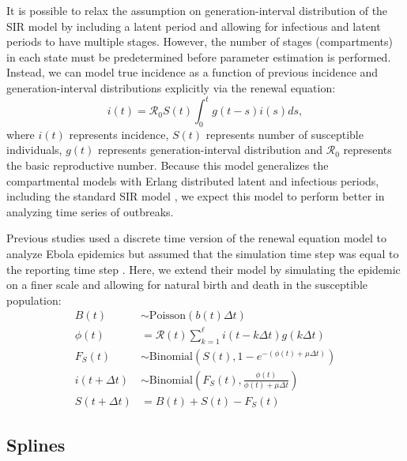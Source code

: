 \documentclass{article}
\begin{document}
It is possible to relax the assumption on generation-interval distribution of the SIR model by including a latent period and allowing for infectious and latent periods to have multiple stages.
However, the number of stages (compartments) in each state must be predetermined before parameter estimation is performed.
Instead, we can model true incidence as a function of previous incidence and generation-interval distributions explicitly via the renewal equation:
\begin{equation}
i(t) = \mathcal R_0 S(t) \int_0^t g(t-s) i(s) ds,
\end{equation}
where $i(t)$ represents incidence, $S(t)$ represents number of susceptible individuals, $g(t)$ represents generation-interval distribution and $\mathcal R_0$ represents the basic reproductive number.
Because this model generalizes the compartmental models with Erlang distributed latent and infectious periods, including the standard SIR model \citep{champredon2018equivalence}, we expect this model to perform better in analyzing time series of outbreaks.

Previous studies used a discrete time version of the renewal equation model to analyze Ebola epidemics but assumed that the simulation time step was equal to the reporting time step \citep{li2018fitting, champredon2018two}. 
Here, we extend their model by simulating the epidemic on a finer scale and allowing for natural birth and death in the susceptible population:
\begin{equation}
\begin{aligned}
B(t) &\sim \mathrm{Poisson}(b(t) \Delta t)\\
\phi(t) &= \mathcal R(t) \sum_{k=1}^\ell i(t - k \Delta t) g(k \Delta t)\\
F_{S}(t) &\sim \mathrm{Binomial}\left(S(t), 1 - e^{-(\phi(t) + \mu \Delta t)} \right)\\
i(t + \Delta t) &\sim \mathrm{Binomial}\left(F_{S}(t), \frac{\phi(t)}{\phi(t) + \mu \Delta t} \right)\\
S(t + \Delta t) &= B(t) + S(t) - F_{S}(t)
\end{aligned}
\end{equation}

\subsection{Splines}
\end{document}
